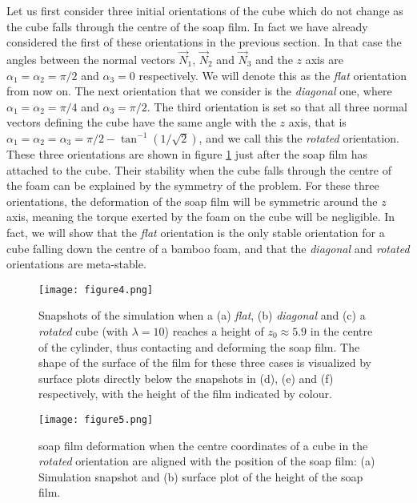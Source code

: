 \documentclass[preprint]{revtex4-1}
\begin{document}
Let us first consider three initial orientations of the cube which do not change as the cube falls through the centre of the soap film. In fact we have already considered the first of these orientations in the previous section. In that case the angles between the normal vectors $\vec{N}_1$, $\vec{N}_2$ and $\vec{N}_3$ and the $z$ axis are $\alpha_1=\alpha_2=\pi/2$ and $\alpha_3=0$ respectively. We will denote this as the \emph{flat} orientation from now on. The next orientation that we consider is the \emph{diagonal} one, where $\alpha_1=\alpha_2=\pi/4$ and $\alpha_3=\pi/2$. The third orientation is set so that all three normal vectors defining the cube have the same angle with the $z$ axis, that is $\alpha_1=\alpha_2=\alpha_3=\pi/2-\tan^{-1}\left(1/\sqrt{2}\right)$, and we call this the \emph{rotated} orientation. These three orientations are shown in figure \ref{fig:cube_attachment} just after the soap film has attached to the cube. Their stability when the cube falls through the centre of the foam can be explained by the symmetry of the problem. For these three orientations, the deformation of the soap film will be symmetric around the $z$ axis, meaning the torque exerted by the foam on the cube will be negligible. In fact, we will show that the \emph{flat} orientation is the only stable orientation for a cube falling down the centre of a bamboo foam, and that the \emph{diagonal} and \emph{rotated} orientations are meta-stable. 


\begin{figure}
	\centering
\texttt{[image: figure4.png]}
	\caption{Snapshots of the simulation when a (a) \emph{flat}, (b) \emph{diagonal} and (c) a \emph{rotated} cube (with $\lambda=10$) reaches a height of $z_0\approx 5.9$ in the centre of the cylinder, thus contacting and deforming the soap film. The shape of the surface of the film for these three cases is visualized by surface plots directly below the snapshots in (d), (e) and (f) respectively, with the height of the film indicated by colour.}
	\label{fig:cube_attachment}
\end{figure}






\begin{figure}
	\centering
\texttt{[image: figure5.png]}
	\caption{soap film deformation when the centre coordinates of a cube in the \emph{rotated} orientation are aligned with the position of the soap film: (a) Simulation snapshot and (b) surface plot of the height of the soap film.}
	\label{fig:cube_immersed}
\end{figure}
\end{document}
